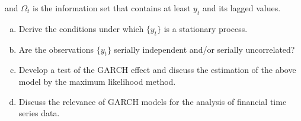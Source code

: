 and \(\Omega_t\) is the information set that contains at least \(y_t\) and its lagged values.

\begin{enumerate}[(a)]

\item Derive the conditions under which \(\{y_t\}\) is a stationary process.

\item Are the observations \(\{y_t\}\) serially independent and/or serially uncorrelated?

\item Develop a test of the GARCH effect and discuss the estimation of the above model by the maximum likelihood method.

\item Discuss the relevance of GARCH models for the analysis of financial time series data.

\end{enumerate}

